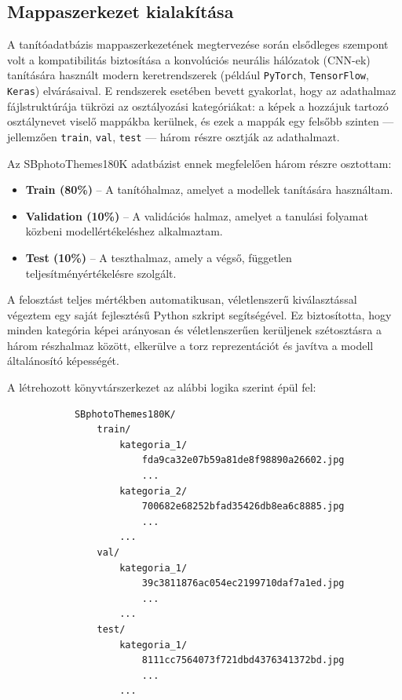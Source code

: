         \subsection{Mappaszerkezet kialakítása}

            A tanítóadatbázis mappaszerkezetének megtervezése során elsődleges szempont volt a kompatibilitás biztosítása a konvolúciós neurális hálózatok (CNN-ek) tanítására használt modern keretrendszerek (például \texttt{PyTorch}, \texttt{TensorFlow}, \texttt{Keras}) elvárásaival. E rendszerek esetében bevett gyakorlat, hogy az adathalmaz fájlstruktúrája tükrözi az osztályozási kategóriákat: a képek a hozzájuk tartozó osztálynevet viselő mappákba kerülnek, és ezek a mappák egy felsőbb szinten — jellemzően \texttt{train}, \texttt{val}, \texttt{test} — három részre osztják az adathalmazt.
            
            Az SBphotoThemes180K adatbázist ennek megfelelően három részre osztottam:
            
            \begin{itemize}
                \item \textbf{Train (80\%)} – A tanítóhalmaz, amelyet a modellek tanítására használtam.
                \item \textbf{Validation (10\%)} – A validációs halmaz, amelyet a tanulási folyamat közbeni modellértékeléshez alkalmaztam.
                \item \textbf{Test (10\%)} – A teszthalmaz, amely a végső, független teljesítményértékelésre szolgált.
            \end{itemize}
            
            A felosztást teljes mértékben automatikusan, véletlenszerű kiválasztással végeztem egy saját fejlesztésű Python szkript segítségével. Ez biztosította, hogy minden kategória képei arányosan és véletlenszerűen kerüljenek szétosztásra a három részhalmaz között, elkerülve a torz reprezentációt és javítva a modell általánosító képességét.
            
            A létrehozott könyvtárszerkezet az alábbi logika szerint épül fel:
            
            \begin{verbatim}
            SBphotoThemes180K/
                train/
                    kategoria_1/
                        fda9ca32e07b59a81de8f98890a26602.jpg
                        ...
                    kategoria_2/
                        700682e68252bfad35426db8ea6c8885.jpg
                        ...
                    ...
                val/
                    kategoria_1/
                        39c3811876ac054ec2199710daf7a1ed.jpg
                        ...
                    ...
                test/
                    kategoria_1/
                        8111cc7564073f721dbd4376341372bd.jpg
                        ...
                    ...
            \end{verbatim}
            
